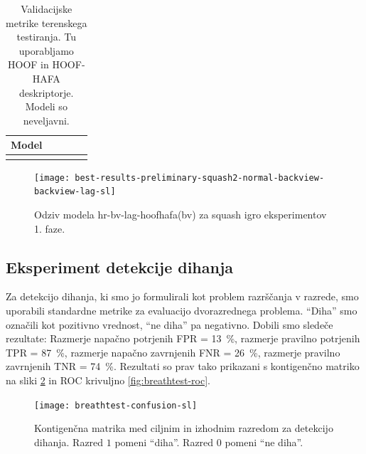 \begin{table}[!htbp]
	\centering
	\begin{tabular}{l S[table-format=1.2, round-mode=places, round-precision=2] S[table-format=1.2, round-mode=places, round-precision=2] S[table-format=1.2, round-mode=places, round-precision=2] S[table-format=1.2, round-mode=places, round-precision=2]}
		\toprule
		\textbf{Model} &  &  &  &  \\
		\midrule
		\bottomrule
	\end{tabular}
	\caption{Validacijske metrike terenskega testiranja. Tu uporabljamo HOOF in HOOF-HAFA deskriptorje. Modeli so neveljavni.}
	\label{tab:squash}
\end{table}

\begin{figure}[!htbp]
	\centering
	\texttt{[image: best-results-preliminary-squash2-normal-backview-backview-lag-sl]}
	\caption{Odziv modela hr-bv-lag-hoofhafa(bv) za squash igro eksperimentov 1. faze.}
	\label{fig:squash-rezultat}
\end{figure}






















\subsection{Eksperiment detekcije dihanja}
Za detekcijo dihanja, ki smo jo formulirali kot problem razrščanja v razrede, smo uporabili standardne metrike za evaluacijo dvorazrednega problema. ``Diha'' smo označili kot pozitivno vrednost, ``ne diha'' pa negativno. Dobili smo sledeče rezultate: Razmerje napačno potrjenih FPR = \SI{13}{\%}, razmerje pravilno potrjenih TPR = \SI{87}{\%}, razmerje napačno zavrnjenih FNR = \SI{26}{\%}, razmerje pravilno zavrnjenih TNR = \SI{74}{\%}. Rezultati so prav tako prikazani s kontigenčno matriko na sliki \ref{fig:breathtest-confusion} in ROC krivuljno \ref{fig:breathtest-roc}.

\begin{figure}[!htbp]
	\centering
	\texttt{[image: breathtest-confusion-sl]}
	\caption{Kontigenčna matrika med ciljnim in izhodnim razredom za detekcijo dihanja. Razred $1$ pomeni ``diha''. Razred $0$ pomeni ``ne diha''.}
	\label{fig:breathtest-confusion}
\end{figure}

